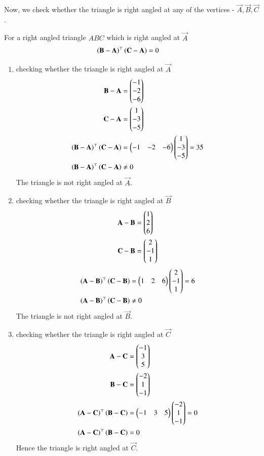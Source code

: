 \documentclass[journal,12pt,twocolumn]{IEEEtran}
\begin{document}
\begin{enumerate}
Now, we check whether the triangle is right angled at any of the vertices -
$ \vec{A}, \vec{B}, \vec{C}$.

For a right angled triangle $ABC$ which is right angled at $\vec{A}$  
\begin{align}
\left(\mathbf{B}-\mathbf{A}\right)^{\top}\left(\mathbf{C}-\mathbf{A}\right) &= 0
\end{align}
 
\begin{enumerate}
\item checking whether the triangle is right angled at $\vec{A}$
\begin{align}
\mathbf{B}-\mathbf{A} &= \begin{pmatrix}-1\\-2\\-6\end{pmatrix} \\
\mathbf{C}-\mathbf{A} &= \begin{pmatrix}1\\-3\\-5\end{pmatrix} \\
\left(\mathbf{B}-\mathbf{A}\right)^{\top}\left(\mathbf{C}-\mathbf{A}\right) &= \begin{pmatrix}-1&-2&-6\end{pmatrix}\begin{pmatrix}1\\-3\\-5\end{pmatrix} = 35\\
\left(\mathbf{B}-\mathbf{A}\right)^{\top}\left(\mathbf{C}-\mathbf{A}\right) &\neq 0
\end{align}
The triangle is not right angled at $\vec{A}$.\\

\item checking whether the triangle is right angled at $\vec{B}$
\begin{align}
\mathbf{A}-\mathbf{B} &= \begin{pmatrix}1\\2\\6\end{pmatrix} \\
\mathbf{C}-\mathbf{B} &= \begin{pmatrix}2\\-1\\1\end{pmatrix} 
\end{align}
\begin{align}
\left(\mathbf{A}-\mathbf{B}\right)^{\top}\left(\mathbf{C}-\mathbf{B}\right) &= \begin{pmatrix}1&2&6\end{pmatrix}\begin{pmatrix}2\\-1\\1\end{pmatrix} = 6\\
\left(\mathbf{A}-\mathbf{B}\right)^{\top}\left(\mathbf{C}-\mathbf{B}\right) &\neq 0
\end{align}
The triangle is not right angled at $\vec{B}$.\\

\item checking whether the triangle is right angled at $\vec{C}$
\begin{align}
\mathbf{A}-\mathbf{C} &= \begin{pmatrix}-1\\3\\5\end{pmatrix} \\
\mathbf{B}-\mathbf{C} &= \begin{pmatrix}-2\\1\\-1\end{pmatrix} \\
\left(\mathbf{A}-\mathbf{C}\right)^{\top}\left(\mathbf{B}-\mathbf{C}\right) &= \begin{pmatrix}-1&3&5\end{pmatrix}\begin{pmatrix}-2\\1\\-1\end{pmatrix} = 0\\
\left(\mathbf{A}-\mathbf{C}\right)^{\top}\left(\mathbf{B}-\mathbf{C}\right) &= 0
\end{align}
Hence the triangle is right angled at $\vec{C}$.
\end{enumerate}
\end{enumerate}
\end{document}

